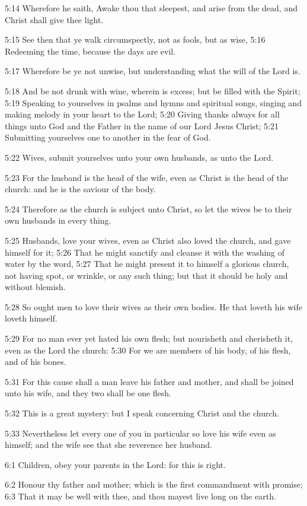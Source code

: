 5:14 Wherefore he saith, Awake thou that sleepest, and arise from the
dead, and Christ shall give thee light.

5:15 See then that ye walk circumspectly, not as fools, but as wise,
5:16 Redeeming the time, because the days are evil.

5:17 Wherefore be ye not unwise, but understanding what the will of
the Lord is.

5:18 And be not drunk with wine, wherein is excess; but be filled with
the Spirit; 5:19 Speaking to yourselves in psalms and hymns and
spiritual songs, singing and making melody in your heart to the Lord;
5:20 Giving thanks always for all things unto God and the Father in
the name of our Lord Jesus Christ; 5:21 Submitting yourselves one to
another in the fear of God.

5:22 Wives, submit yourselves unto your own husbands, as unto the
Lord.

5:23 For the husband is the head of the wife, even as Christ is the
head of the church: and he is the saviour of the body.

5:24 Therefore as the church is subject unto Christ, so let the wives
be to their own husbands in every thing.

5:25 Husbands, love your wives, even as Christ also loved the church,
and gave himself for it; 5:26 That he might sanctify and cleanse it
with the washing of water by the word, 5:27 That he might present it
to himself a glorious church, not having spot, or wrinkle, or any such
thing; but that it should be holy and without blemish.

5:28 So ought men to love their wives as their own bodies. He that
loveth his wife loveth himself.

5:29 For no man ever yet hated his own flesh; but nourisheth and
cherisheth it, even as the Lord the church: 5:30 For we are members of
his body, of his flesh, and of his bones.

5:31 For this cause shall a man leave his father and mother, and shall
be joined unto his wife, and they two shall be one flesh.

5:32 This is a great mystery: but I speak concerning Christ and the
church.

5:33 Nevertheless let every one of you in particular so love his wife
even as himself; and the wife see that she reverence her husband.

6:1 Children, obey your parents in the Lord: for this is right.

6:2 Honour thy father and mother; which is the first commandment with
promise; 6:3 That it may be well with thee, and thou mayest live long
on the earth.

